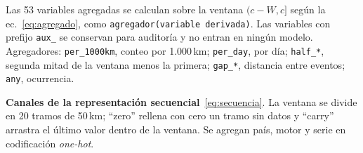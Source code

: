Las 53 variables agregadas se calculan sobre la ventana $(c - W, c]$ según la ec.~\eqref{eq:agregado}, como
\texttt{agregador(variable derivada)}. Las variables con prefijo \texttt{aux\_} se conservan para auditoría y no entran en
ningún modelo. Agregadores: \texttt{per\_1000km}, conteo por 1.000\,km; \texttt{per\_day}, por día; \texttt{half\_*},
segunda mitad de la ventana menos la primera; \texttt{gap\_*}, distancia entre eventos; \texttt{any}, ocurrencia.

{\scriptsize

}

\textbf{Canales de la representación secuencial}~\eqref{eq:secuencia}. La ventana se divide en 20 tramos de 50\,km;
``zero'' rellena con cero un tramo sin datos y ``carry'' arrastra el último valor dentro de la ventana. Se agregan país, motor
y serie en codificación \emph{one-hot}.

\begin{center}
\footnotesize

\end{center}
